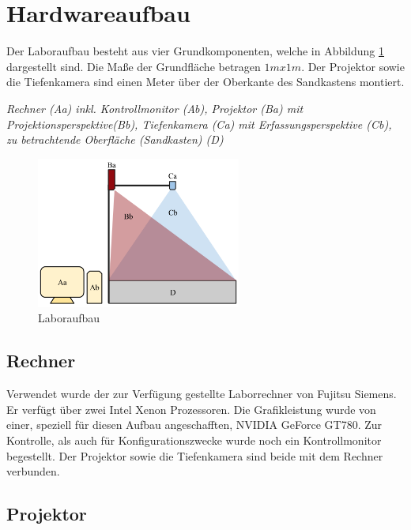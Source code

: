 \section{Hardwareaufbau}
\begin{Spacing}{\mylinespace}

Der Laboraufbau besteht aus vier Grundkomponenten, welche in Abbildung \ref{fig:laboraufbau} dargestellt sind. Die Maße der Grundfläche betragen $1m x 1m$. Der Projektor sowie die Tiefenkamera sind einen Meter über der Oberkante des Sandkastens montiert.

\vspace{0.2cm}
\textit{Rechner (Aa) inkl. Kontrollmonitor (Ab), Projektor (Ba) mit Projektionsperspektive(Bb), Tiefenkamera (Ca) mit Erfassungsperspektive (Cb), zu betrachtende Oberfläche (Sandkasten) (D)}

\begin{figure}[hbtp]
	\centering
	\label{fig:laboraufbau}
	\includegraphics[width=0.6\textwidth]{graphics/Aufbau.png}
	\caption{Laboraufbau}
\end{figure}

\subsection{Rechner}

Verwendet wurde der zur Verfügung gestellte Laborrechner von Fujitsu Siemens. Er verfügt über zwei Intel Xenon Prozessoren. Die Grafikleistung wurde von einer, speziell für diesen Aufbau angeschafften, NVIDIA GeForce GT780. Zur Kontrolle, als auch für Konfigurationszwecke wurde noch ein Kontrollmonitor begestellt. Der Projektor sowie die Tiefenkamera sind beide mit dem Rechner verbunden.

\subsection{Projektor}


\end{Spacing}
